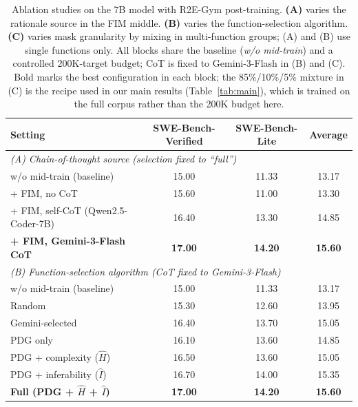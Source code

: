\begin{table}[t]
\centering
\caption{Ablation studies on the 7B model with R2E-Gym post-training.
\textbf{(A)} varies the rationale source in the FIM middle.
\textbf{(B)} varies the function-selection algorithm.
\textbf{(C)} varies mask granularity by mixing in multi-function groups;
(A) and (B) use single functions only. All blocks share the baseline
(\emph{w/o mid-train}) and a controlled 200K-target budget; CoT is
fixed to Gemini-3-Flash in (B) and (C). Bold marks the best
configuration in each block; the 85\%/10\%/5\% mixture in (C) is the
recipe used in our main results (Table~\ref{tab:main}), which is
trained on the full corpus rather than the 200K budget here.}
\label{tab:ablation}
\small
\setlength{\tabcolsep}{8pt}
\begin{tabular}{lccc}
\toprule
Setting & SWE-Bench-Verified & SWE-Bench-Lite & Average \\
\midrule
\multicolumn{4}{l}{\emph{(A) Chain-of-thought source (selection fixed to ``full'')}} \\
\midrule
w/o mid-train (baseline)                  & 15.00 & 11.33 & 13.17 \\
+ FIM, no CoT                             & 15.60 & 11.00 & 13.30 \\
+ FIM, self-CoT (Qwen2.5-Coder-7B)        & 16.40 & 13.30 & 14.85 \\
\textbf{+ FIM, Gemini-3-Flash CoT}        & \textbf{17.00} & \textbf{14.20} & \textbf{15.60} \\
\midrule
\multicolumn{4}{l}{\emph{(B) Function-selection algorithm (CoT fixed to Gemini-3-Flash)}} \\
\midrule
w/o mid-train (baseline)                    & 15.00 & 11.33 & 13.17 \\
Random                                      & 15.30 & 12.60 & 13.95 \\
Gemini-selected                             & 16.40 & 13.70 & 15.05 \\
PDG only                                    & 16.10 & 13.60 & 14.85 \\
PDG + complexity ($\hat{H}$)                & 16.50 & 13.60 & 15.05 \\
PDG + inferability ($\hat{I}$)              & 16.70 & 14.00 & 15.35 \\
\textbf{Full (PDG + $\hat{H}$ + $\hat{I}$)} & \textbf{17.00} & \textbf{14.20} & \textbf{15.60} \\

\end{tabular}
\end{table}

